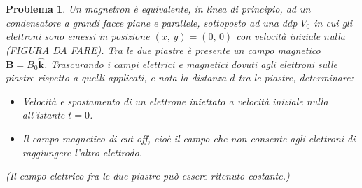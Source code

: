 \documentclass[a4paper,oneside]{article}
\newtheorem{problema}{Problema}
\renewcommand{\vec}[1]{\mathbf{#1}}
\renewcommand{\hat}[1]{\widehat{\mathbf{#1}}}
\begin{document}
\begin{problema}
		Un magnetron è equivalente, in linea di principio, ad un condensatore a grandi facce
		piane e parallele, sottoposto ad una ddp $V_0$ in cui gli elettroni sono emessi in
		posizione $(x,\,y) = (0,\,0)$ con velocità iniziale nulla (FIGURA DA FARE). Tra le
		due piastre è presente un campo magnetico $\vec{B} = B_0 \hat{k}$. Trascurando i campi
		elettrici e magnetici dovuti agli elettroni sulle piastre rispetto a quelli applicati,
		e nota la distanza $d$ tra le piastre, determinare:
		\begin{itemize}
			\item Velocità e spostamento di un elettrone iniettato a velocità iniziale nulla
			all'istante $t=0$.
			\item Il campo magnetico di cut-off, cioè il campo che non consente agli elettroni
			di raggiungere l'altro elettrodo.
		\end{itemize}
		(Il campo elettrico fra le due piastre può essere ritenuto costante.)
\end{problema}
\end{document}
